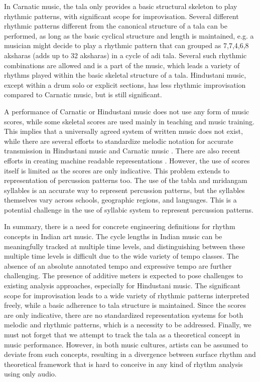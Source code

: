 In Carnatic music, the \gls{tala} only provides a basic structural skeleton to play rhythmic patterns, with significant scope for improvisation. Several different rhythmic patterns different from the canonical structure of a \gls{tala} can be performed, as long as the basic cyclical structure and length is maintained, e.g. a musician might decide to play a rhythmic pattern that can grouped as 7,7,4,6,8 \glspl{akshara} (adds up to 32 \glspl{akshara}) in a cycle of \gls{adi} \gls{tala}. Several such rhythmic combinations are allowed and is a part of the music, which leads a variety of rhythms played within the basic skeletal structure of a \gls{tala}. Hindustani music, except within a drum solo or explicit sections, has less rhythmic improvisation compared to Carnatic music, but is still significant. 

A performance of Carnatic or Hindustani music does not use any form of music scores, while some skeletal scores are used mainly in teaching and music training. This implies that a universally agreed system of written music does not exist, while there are several efforts to standardize melodic notation for accurate transmission in Hindustani music \cite{bhatkhande:90:book,jha:01:book} and Carnatic music \cite{ravikiran:08:carnatic}. There are also recent efforts in creating machine readable representations \cite{chordia:07:representation,ajay:12:humdrum}. However, the use of scores itself is limited as the scores are only indicative. This problem extends to representation of percussion patterns too. The use of the \gls{tabla} and mridangam syllables is an accurate way to represent percussion patterns, but the syllables themselves vary across schools, geographic regions, and languages. This is a potential challenge in the use of syllabic system to represent percussion patterns. 

In summary, there is a need for concrete engineering definitions for rhythm concepts in Indian art music. The cycle lengths in Indian music can be meaningfully tracked at multiple time levels, and distinguishing between these multiple time levels is difficult due to the wide variety of tempo classes. The absence of an absolute annotated tempo and expressive tempo are further challenging. The presence of additive meters is expected to pose challenges to existing analysis approaches, especially for Hindustani music. The significant scope for improvisation leads to a wide variety of rhythmic patterns interpreted freely, while a basic adherence to \gls{tala} structure is maintained. Since the scores are only indicative, there are no standardized representation systems for both melodic and rhythmic patterns, which is a necessity to be addressed. Finally, we must not forget that we attempt to track the \gls{tala} as a theoretical concept in music performance. However, in both music cultures, artists can be assumed to deviate from such concepts, resulting in a divergence between surface rhythm and theoretical framework that is hard to conceive in any kind of rhythm analysis using only audio.
